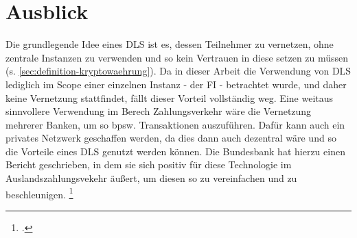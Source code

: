 \noindent

\section{Ausblick}
\label{sec:ausblick}

Die grundlegende Idee eines DLS ist es, dessen Teilnehmer zu vernetzen, ohne zentrale Instanzen zu verwenden und so kein Vertrauen in diese setzen zu müssen (s. \ref{sec:definition-kryptowaehrung}).
Da in dieser Arbeit die Verwendung von DLS lediglich im Scope einer einzelnen Instanz - der FI - betrachtet wurde, und daher keine Vernetzung stattfindet, fällt dieser Vorteil vollständig weg.
Eine weitaus sinnvollere Verwendung im Berech Zahlungsverkehr wäre die Vernetzung mehrerer Banken, um so bpsw. Transaktionen auszuführen.
Dafür kann auch ein privates Netzwerk geschaffen werden, da dies dann auch dezentral wäre und so die Vorteile eines DLS genutzt werden können.
Die Bundesbank hat hierzu einen Bericht geschrieben, in dem sie sich positiv für diese Technologie im Auslandszahlungsvekehr äußert, um diesen so zu vereinfachen und zu beschleunigen. \footcite[Vgl.][44]{q12}